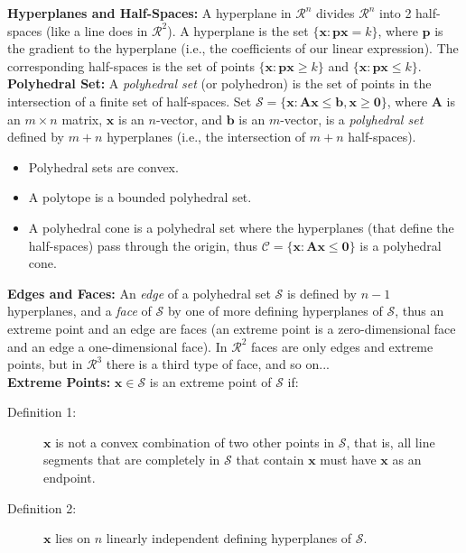 {\bf Hyperplanes and Half-Spaces:} A hyperplane in $\mathcal{R}^n$ divides $\mathcal{R}^n$ into 2 half-spaces (like a line does in $\mathcal{R}^2$). A hyperplane is the set $\{\mathbf{x}: \mathbf{p}\mathbf{x} = k\}$, where $\mathbf{p}$ is the gradient to the hyperplane (i.e., the coefficients of our linear expression). The corresponding half-spaces is the set of points $\{\mathbf{x}: \mathbf{p}\mathbf{x} \ge k\}$ and $\{\mathbf{x}: \mathbf{p}\mathbf{x} \le k\}$. \\

{\bf Polyhedral Set:} A {\it polyhedral set} (or polyhedron) is the set of points in the intersection of a finite set of half-spaces. Set $\mathcal{S} = \{\mathbf{x}: \mathbf{A} \mathbf{x} \le \mathbf{b}, \mathbf{x} \ge \mathbf{0}\}$, where $\mathbf{A}$ is an $m \times n$ matrix, $\mathbf{x}$ is an $n$-vector, and $\mathbf{b}$ is an $m$-vector, is a {\it polyhedral set} defined by $m + n$ hyperplanes (i.e., the intersection of $m + n$ half-spaces).
\begin{itemize}
\item Polyhedral sets are convex. 
\item A polytope is a bounded polyhedral set.
\item A polyhedral cone is a polyhedral set where the hyperplanes (that define the half-spaces) pass through the origin, thus $\mathcal{C} = \{\mathbf{x}: \mathbf{A} \mathbf{x} \le \mathbf{0}\}$ is a polyhedral cone.
\end{itemize}

{\bf Edges and Faces:} An {\it edge} of a polyhedral set $\mathcal{S}$ is defined by $n-1$ hyperplanes, and a {\it face} of $\mathcal{S}$ by one of more defining hyperplanes of $\mathcal{S}$, thus an extreme point and an edge are faces (an extreme point is a zero-dimensional face and an edge a one-dimensional face).  In $\mathcal{R}^2$ faces are only edges and extreme points, but in $\mathcal{R}^3$ there is a third type of face, and so on... \\

{\bf Extreme Points:} $\mathbf{x} \in \mathcal{S}$ is an extreme point of $\mathcal{S}$ if:
\begin{description}
\item[Definition 1:] $\mathbf{x}$ is not a convex combination of two other points in $\mathcal{S}$, that is, all line segments that are completely in $\mathcal{S}$ that contain $\mathbf{x}$ must have $\mathbf{x}$ as an endpoint.
\item[Definition 2:] $\mathbf{x}$ lies on $n$ linearly independent defining hyperplanes of $\mathcal{S}$.
\end{description}


